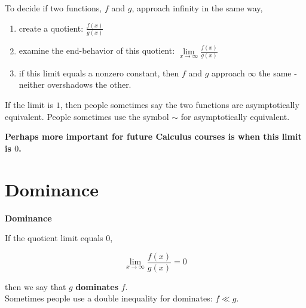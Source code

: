\documentclass{ximera}
\begin{document}
\begin{idea}


To decide if two functions, $f$ and $g$, approach infinity in the same way, 

\begin{enumerate}
\item create a quotient: $\frac{f(x)}{g(x)}$ \\


\item examine the end-behavior of this quotient: $\lim\limits_{x \to \infty} \frac{f(x)}{g(x)}$ \\


\item if this limit equals a nonzero constant, then $f$ and $g$ approach $\infty$ the same - neither overshadows the other.
\end{enumerate}


If the limit is $1$, then people sometimes say the two functions are asymptotically equivalent. People sometimes use the symbol $\sim$ for asymptotically equivalent. \\

\end{idea}




\begin{center}

\textbf{\textcolor{purple!85!blue}{Perhaps more important for future Calculus courses is when this limit is $0$.}} \\

\end{center}















\section*{Dominance}



\begin{definition}  \textbf{\textcolor{green!50!black}{Dominance}} 

If the quotient limit equals $0$,

\[  \lim_{x \to \infty} \frac{f(x)}{g(x)}  = 0\]

then we say that $g$ \textbf{dominates} $f$. \\



Sometimes people use a double inequality for dominates:  $f \ll g$.\\

\end{definition}
\end{document}
